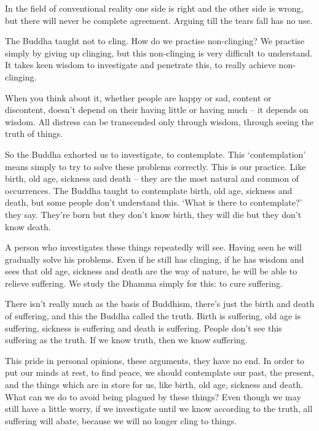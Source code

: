 In the field of conventional reality one side is right and the other side is wrong, but there will never be complete agreement. Arguing till the tears fall has no use.

The Buddha taught not to cling. How do we practise non-clinging? We practise simply by giving up clinging, but this non-clinging is very difficult to understand. It takes keen wisdom to investigate and penetrate this, to really achieve non-clinging.

When you think about it, whether people are happy or sad, content or discontent, doesn't depend on their having little or having much -- it depends on wisdom. All distress can be transcended only through wisdom, through seeing the truth of things.

So the Buddha exhorted us to investigate, to contemplate. This `contemplation' means simply to try to solve these problems correctly. This is our practice. Like birth, old age, sickness and death -- they are the most natural and common of occurrences. The Buddha taught to contemplate birth, old age, sickness and death, but some people don't understand this. `What is there to contemplate?' they say. They're born but they don't know birth, they will die but they don't know death.

A person who investigates these things repeatedly will see. Having seen he will gradually solve his problems. Even if he still has clinging, if he has wisdom and sees that old age, sickness and death are the way of nature, he will be able to relieve suffering. We study the Dhamma simply for this: to cure suffering.

There isn't really much as the basis of Buddhism, there's just the birth and death of suffering, and this the Buddha called the truth. Birth is suffering, old age is suffering, sickness is suffering and death is suffering. People don't see this suffering as the truth. If we know truth, then we know suffering.

This pride in personal opinions, these arguments, they have no end. In order to put our minds at rest, to find peace, we should contemplate our past, the present, and the things which are in store for us, like birth, old age, sickness and death. What can we do to avoid being plagued by these things? Even though we may still have a little worry, if we investigate until we know according to the truth, all suffering will abate, because we will no longer cling to things.

